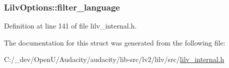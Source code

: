 \subsubsection[{\texorpdfstring{filter\+\_\+language}{filter_language}}]{ Lilv\+Options\+::filter\+\_\+language}\hypertarget{struct_lilv_options_a9f186f30aa1f207befab6836fca11814}{}\label{struct_lilv_options_a9f186f30aa1f207befab6836fca11814}


Definition at line 141 of file lilv\+\_\+internal.\+h.



The documentation for this struct was generated from the following file\+:\begin{DoxyCompactItemize}
\item 
C\+:/\+\_\+dev/\+Open\+U/\+Audacity/audacity/lib-\/src/lv2/lilv/src/\hyperlink{lilv__internal_8h}{lilv\+\_\+internal.\+h}\end{DoxyCompactItemize}
